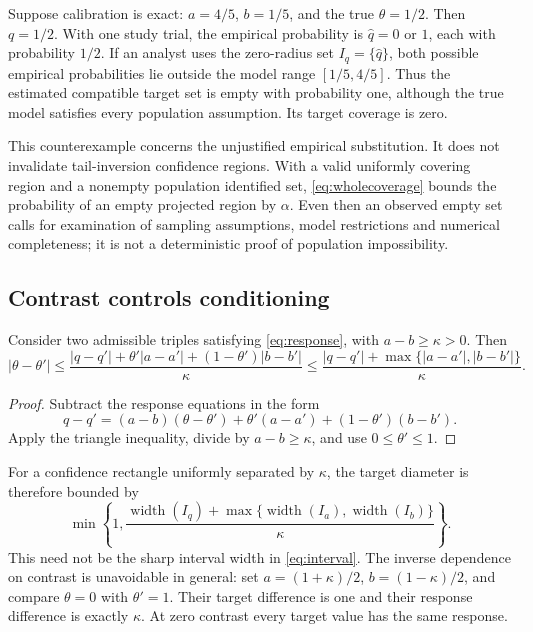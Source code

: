 \documentclass[11pt]{article}
\begin{document}
Suppose calibration is exact: $a=4/5$, $b=1/5$, and the true $\theta=1/2$. Then $q=1/2$. With one study trial, the empirical probability is $\widehat q=0$ or $1$, each with probability $1/2$. If an analyst uses the zero-radius set $I_q=\{\widehat q\}$, both possible empirical probabilities lie outside the model range $[1/5,4/5]$. Thus the estimated compatible target set is empty with probability one, although the true model satisfies every population assumption. Its target coverage is zero.

This counterexample concerns the unjustified empirical substitution. It does not invalidate tail-inversion confidence regions. With a valid uniformly covering region and a nonempty population identified set, \eqref{eq:wholecoverage} bounds the probability of an empty projected region by $\alpha$. Even then an observed empty set calls for examination of sampling assumptions, model restrictions and numerical completeness; it is not a deterministic proof of population impossibility.

\subsection{Contrast controls conditioning}

\begin{proposition}
Consider two admissible triples satisfying \eqref{eq:response}, with $a-b\ge\kappa>0$. Then
\begin{equation}
 |\theta-\theta'|\le
 \frac{|q-q'|+\theta'|a-a'|+(1-\theta')|b-b'|}{\kappa}
 \le\frac{|q-q'|+\max\{|a-a'|,|b-b'|\}}{\kappa}.
 \label{eq:conditioning}
\end{equation}
\end{proposition}
\begin{proof}
Subtract the response equations in the form
\[
 q-q'=(a-b)(\theta-\theta')
        +\theta'(a-a')+(1-\theta')(b-b').
\]
Apply the triangle inequality, divide by $a-b\ge\kappa$, and use $0\le\theta'\le1$.
\end{proof}

For a confidence rectangle uniformly separated by $\kappa$, the target diameter is therefore bounded by
\[
 \min\left\{1,\frac{\operatorname{width}(I_q)
                  +\max\{\operatorname{width}(I_a),\operatorname{width}(I_b)\}}{\kappa}\right\}.
\]
This need not be the sharp interval width in \eqref{eq:interval}. The inverse dependence on contrast is unavoidable in general: set $a=(1+\kappa)/2$, $b=(1-\kappa)/2$, and compare $\theta=0$ with $\theta'=1$. Their target difference is one and their response difference is exactly $\kappa$. At zero contrast every target value has the same response.
\end{document}
